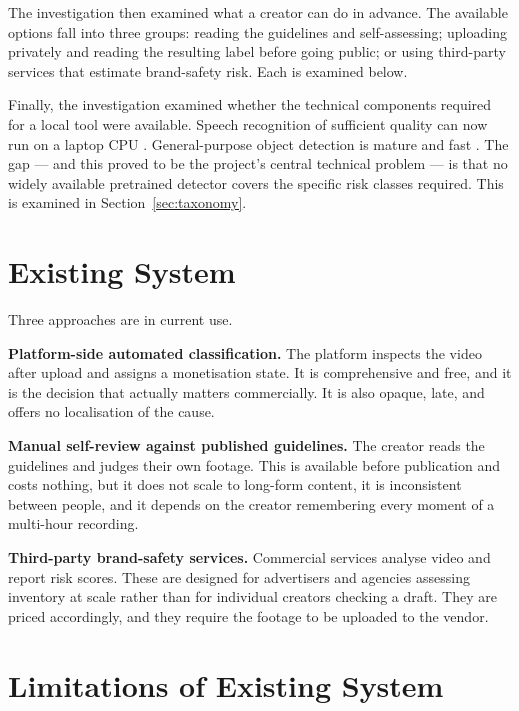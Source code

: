 \documentclass[
12pt,
a4paper,
oneside
]{report}
\begin{document}
The investigation then examined what a creator can do in advance. The available
options fall into three groups: reading the guidelines and self-assessing;
uploading privately and reading the resulting label before going public; or
using third-party services that estimate brand-safety risk. Each is examined
below.

Finally, the investigation examined whether the technical components required
for a local tool were available. Speech recognition of sufficient quality can
now run on a laptop CPU \cite{Radford2023, CTranslate2}. General-purpose object
detection is mature and fast \cite{Redmon2016, Jocher2023}. The gap --- and this
proved to be the project's central technical problem --- is that no widely
available pretrained detector covers the specific risk classes required. This is
examined in Section~\ref{sec:taxonomy}.

\section{Existing System}

Three approaches are in current use.

\textbf{Platform-side automated classification.} The platform inspects the video
after upload and assigns a monetisation state. It is comprehensive and free, and
it is the decision that actually matters commercially. It is also opaque, late,
and offers no localisation of the cause.

\textbf{Manual self-review against published guidelines.} The creator reads the
guidelines and judges their own footage. This is available before publication
and costs nothing, but it does not scale to long-form content, it is
inconsistent between people, and it depends on the creator remembering every
moment of a multi-hour recording.

\textbf{Third-party brand-safety services.} Commercial services analyse video
and report risk scores. These are designed for advertisers and agencies
assessing inventory at scale rather than for individual creators checking a
draft. They are priced accordingly, and they require the footage to be uploaded
to the vendor.

\section{Limitations of Existing System}
\end{document}

